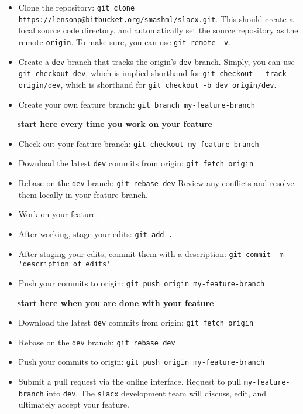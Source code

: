 \begin{itemize} 
\item Clone the repository: \verb|git clone https://lensonp@bitbucket.org/smashml/slacx.git|.
    This should create a local source code directory,
    and automatically set the source repository as the remote \verb|origin|.
    To make sure, you can use \verb|git remote -v|.
\item Create a \verb|dev| branch that tracks the origin's \verb|dev| branch.
    Simply, you can use \verb|git checkout dev|, which is implied shorthand for
    \verb|git checkout --track origin/dev|, which is shorthand for
    \verb|git checkout -b dev origin/dev|. 
\item Create your own feature branch: \verb|git branch my-feature-branch| 
\end{itemize} 
\textbf{--- start here every time you work on your feature ---}
\begin{itemize} 
\item Check out your feature branch: \verb|git checkout my-feature-branch|
\item Download the latest \verb|dev| commits from origin: \verb|git fetch origin| 
\item Rebase on the \verb|dev| branch: \verb|git rebase dev|
    Review any conflicts and resolve them locally in your feature branch.
\item Work on your feature.
\item After working, stage your edits: \verb|git add .|
\item After staging your edits, commit them with a description: 
    \verb|git commit -m 'description of edits'|
\item Push your commits to origin: \verb|git push origin my-feature-branch|
\end{itemize} 
\textbf{--- start here when you are done with your feature ---}
\begin{itemize} 
\item Download the latest \verb|dev| commits from origin: \verb|git fetch origin| 
\item Rebase on the \verb|dev| branch: \verb|git rebase dev|
\item Push your commits to origin: \verb|git push origin my-feature-branch|
\item Submit a pull request via the online interface.
    Request to pull \verb|my-feature-branch| into \verb|dev|.
    The \verb|slacx| development team will discuss, edit, 
    and ultimately accept your feature.
\end{itemize} 

